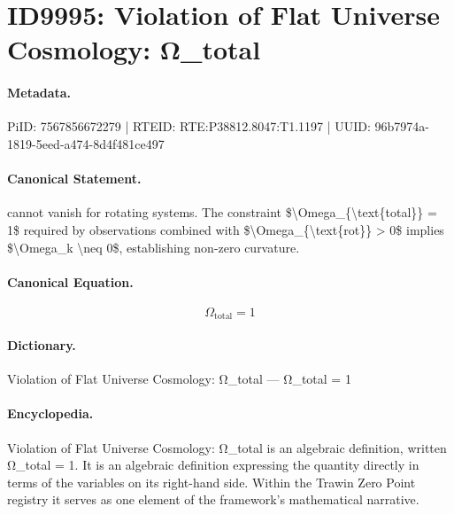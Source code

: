 \section*{ID9995: Violation of Flat Universe Cosmology: Ω\_total}
\paragraph{Metadata.}
PiID: 7567856672279 | RTEID: RTE:P38812.8047:T1.1197 | UUID: 96b7974a-1819-5eed-a474-8d4f481ce497

\paragraph{Canonical Statement.}
cannot vanish for rotating systems. The constraint \$\textbackslash{}Omega\_\{\textbackslash{}text\{total\}\} = 1\$ required by observations combined with \$\textbackslash{}Omega\_\{\textbackslash{}text\{rot\}\} > 0\$ implies \$\textbackslash{}Omega\_k \textbackslash{}neq 0\$, establishing non-zero curvature.

\paragraph{Canonical Equation.}
\[
\Omega_{\text{total}} = 1
\]

\paragraph{Dictionary.}
Violation of Flat Universe Cosmology: Ω\_total — Ω\_total = 1

\paragraph{Encyclopedia.}
Violation of Flat Universe Cosmology: Ω\_total is an algebraic definition, written Ω\_total = 1. It is an algebraic definition expressing the quantity directly in terms of the variables on its right-hand side. Within the Trawin Zero Point registry it serves as one element of the framework's mathematical narrative.
